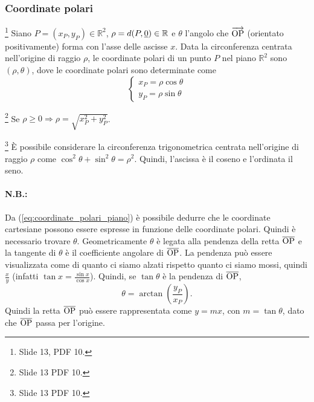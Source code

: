 \subsubsection{Coordinate polari}
\begin{definition}\footnote{Slide 13, PDF 10.}\label{def:coordinate_polari}
    Siano $P=(x_P,y_P)\in\mathbb R^2$, $\rho=d(P,\uline 0)\in\mathbb R$ e $\theta$ l'angolo che $\overrightarrow{\rm OP}$ (orientato positivamente) forma con l'asse delle ascisse $x$. Data la circonferenza centrata nell'origine di raggio $\rho$, le coordinate polari di un punto $P$ nel piano $\mathbb R^2$ sono $(\rho, \theta)$, dove le coordinate polari sono determinate come
    \begin{equation}\label{eq:coordinate_polari_piano}
        \begin{cases}
            x_P=\rho\cos\theta\\
            y_P=\rho\sin\theta
        \end{cases}
    \end{equation}
\end{definition}

\begin{remark}\footnote{Slide 13 PDF 10.}
    Se $\rho\geq 0\Rightarrow \rho=\sqrt{x_P^2+y_P^2}$.
\end{remark}

\begin{remark}\footnote{Slide 13 PDF 10.}
    È possibile considerare la circonferenza trigonometrica centrata nell'origine di raggio $\rho$ come $\cos^2\theta+\sin^2\theta=\rho^2$. Quindi, l'ascissa è il coseno e l'ordinata il seno.
\end{remark}

\paragraph{N.B.:} Da (\ref{eq:coordinate_polari_piano}) è possibile dedurre che le coordinate cartesiane possono essere espresse in funzione delle coordinate polari. Quindi è necessario trovare $\theta$. Geometricamente $\theta$ è legata alla pendenza della retta $\overline{\rm OP}$ e la tangente di $\theta$ è il coefficiente angolare di $\overline{\rm OP}$. La pendenza può essere visualizzata come di quanto ci siamo alzati rispetto quanto ci siamo mossi, quindi $\frac{x}{y}$ (infatti $\tan x=\frac{\sin x}{\cos x}$). Quindi, se $\tan\theta$ è la pendenza di $\overline{\rm OP}$, 
\begin{equation*}
    \theta=\arctan\left(\frac{y_P}{x_P}\right).
\end{equation*}
Quindi la retta $\overline{\rm OP}$ può essere rappresentata come $y=mx$, con $m=\tan\theta$, dato che $\overline{\rm OP}$ passa per l'origine.

